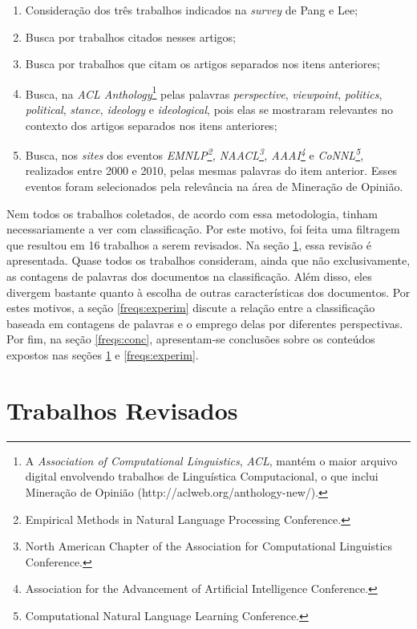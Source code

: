 \begin{enumerate}
\item Consideração dos três trabalhos indicados na \emph{survey} de Pang e Lee;
\item Busca por trabalhos citados nesses artigos;
\item Busca por trabalhos que citam os artigos separados nos itens anteriores;
\item Busca, na \emph{ACL Anthology}\footnote{A \emph{Association of Computational Linguistics}, \emph{ACL}, mantém o maior arquivo digital envolvendo trabalhos de Linguística Computacional, o que inclui Mineração de Opinião (http://aclweb.org/anthology-new/).} pelas palavras \emph{perspective}, \emph{viewpoint}, \emph{politics}, \emph{political}, \emph{stance}, \emph{ideology} e \emph{ideological}, pois elas se mostraram relevantes no contexto dos artigos separados nos itens anteriores;
\item Busca, nos \emph{sites} dos eventos \emph{EMNLP\footnote{Empirical Methods in Natural Language Processing Conference.}, NAACL\footnote{North American Chapter of the Association for Computational Linguistics Conference.}, AAAI\footnote{Association for the Advancement of Artificial Intelligence Conference.}} e \emph{CoNNL\footnote{Computational Natural Language Learning Conference.}}, realizados entre 2000 e 2010, pelas mesmas palavras do item anterior. Esses eventos foram selecionados pela relevância na área de Mineração de Opinião. 
\end{enumerate}

Nem todos os trabalhos coletados, de acordo com essa metodologia, tinham necessariamente a ver com classificação. Por este motivo, foi feita uma filtragem que resultou em 16 trabalhos a serem revisados. Na seção \ref{freqs:revisao}, essa revisão é apresentada. Quase todos os trabalhos consideram, ainda que não exclusivamente, as contagens de palavras dos documentos na classificação. Além disso, eles divergem bastante quanto à escolha de outras características dos documentos. Por estes motivos, a seção \ref{freqs:experim} discute a relação entre a classificação baseada em contagens de palavras e o emprego delas por diferentes perspectivas. Por fim, na seção \ref{freqs:conc}, apresentam-se conclusões sobre os conteúdos expostos nas seções \ref{freqs:revisao} e \ref{freqs:experim}. 

\section{Trabalhos Revisados}
\label{freqs:revisao}

